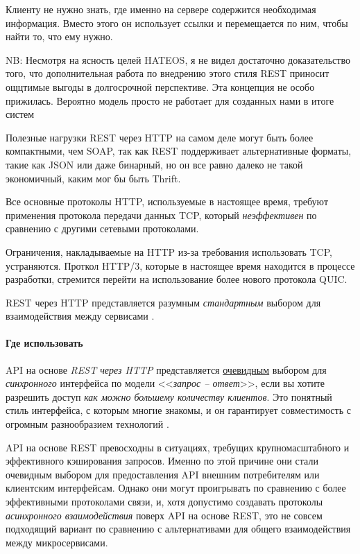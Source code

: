 \documentclass[%
	11pt,
	a4paper,
	utf8,
		]{article}
\begin{document}
Клиенту не нужно знать, где именно на сервере содержится необходимая информация. Вместо этого он использует ссылки и перемещается по ним, чтобы найти то, что ему нужно.

NB: {\color{red} Несмотря на ясность целей HATEOS, я не видел достаточно доказательство того, что дополнительная работа по внедрению этого стиля REST приносит ощцтимые выгоды в долгосрочной перспективе. Эта концепция не особо прижилась. Вероятно модель просто не работает для созданных нами в итоге систем}

Полезные нагрузки REST через HTTP на самом деле могут быть более компактными, чем SOAP, так как REST поддерживает альтернативные форматы, такие как JSON или даже бинарный, но он все равно далеко не такой экономичный, каким мог бы быть Thrift. 

Все основные протоколы HTTP, используемые в настоящее время, требуют применения протокола передачи данных TCP, который \emph{неэффективен} по сравнению с другими сетевыми протоколами.

Ограничения, накладываемые на HTTP из-за требования использовать TCP, устраняются. Проткол HTTP/3, которые в настоящее время находится в процессе разработки, стремится перейти на использование более нового протокола QUIC.

REST через HTTP представляется разумным \emph{стандартным} выбором для взаимодействия между сервисами \cite[]{microservices-2024}.

\paragraph{Где использовать} {\color{blue}API на основе \emph{REST через HTTP} представляется \underline{очевидным} выбором для \emph{синхронного} интерфейса по модели <<\emph{запрос -- ответ}>>, если вы хотите разрешить доступ \emph{как можно большему количеству клиентов}.} Это понятный стиль интерфейса, с которым многие знакомы, и он гарантирует совместимость с огромным разнообразием технологий \cite[]{microservices-2024}.

API на основе REST превосходны в ситуациях, требущих крупномасштабного и эффективного кэширования запросов. Именно по этой причине они стали очевидным выбором для предоставления API внешним потребителям или клиентским интерфейсам. {\color{red} Однако они могут проигрывать по сравнению с более эффективными протоколами связи, и, хотя допустимо создавать протоколы \emph{асинхронного взаимодействия} поверх API на основе REST, это не совсем подходящий вариант по сравнению с альтернативами для общего взаимодействия между микросервисами.}
\end{document}
